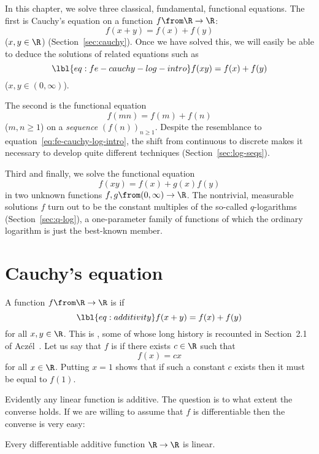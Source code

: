 In this chapter, we solve three classical, fundamental, functional
equations.  The first is Cauchy's equation on a function $f \from \R \to
\R$:
\[
f(x + y) = f(x) + f(y)
\]
($x, y \in \R$) (Section~\ref{sec:cauchy}).  Once we have solved this, we
will easily be able to deduce the solutions of related equations such as
% 
\begin{equation}
\lbl{eq:fe-cauchy-log-intro}
f(xy) = f(x) + f(y)
\end{equation}
% 
($x, y \in (0, \infty)$).  

The second is the functional equation
\[
f(mn) = f(m) + f(n)
\]
($m, n \geq 1$) on a \emph{sequence} $(f(n))_{n \geq 1}$.  Despite the
resemblance to equation~\eqref{eq:fe-cauchy-log-intro}, the shift from
continuous to discrete makes it necessary to develop quite different
techniques (Section~\ref{sec:log-seqs}).

Third and finally, we solve the functional equation
\[
f(xy) = f(x) + g(x)f(y)
\]
in two unknown functions $f, g\from (0, \infty) \to \R$.  The nontrivial,
measurable solutions $f$ turn out to be the constant multiples of the
so-called $q$-logarithms (Section~\ref{sec:q-log}), a one-parameter family
of functions of which the ordinary logarithm is just the best-known member.


\section{Cauchy's equation}


A function $f \from \R \to \R$ is %
%
% 
if
% 
\begin{equation}
\lbl{eq:additivity}
f(x + y) = f(x) + f(y)
\end{equation}
% 
for all $x, y \in \R$.  This is 
, some of whose long history is recounted in
Section~2.1 of Acz\'el~\cite{AczeLFE}.  Let us say that $f$ is
%
%
% 
if there exists $c \in \R$ such that
\[
f(x) = cx
\]
for all $x \in \R$.  Putting $x = 1$ shows that if such a constant $c$
exists then it must be equal to $f(1)$.

Evidently any linear function is additive.  The question is to what extent
the converse holds.  If we are willing to assume that $f$ is differentiable
then the converse is very easy:

\begin{propn}
Every differentiable additive function $\R \to \R$ is linear.
\end{propn}

